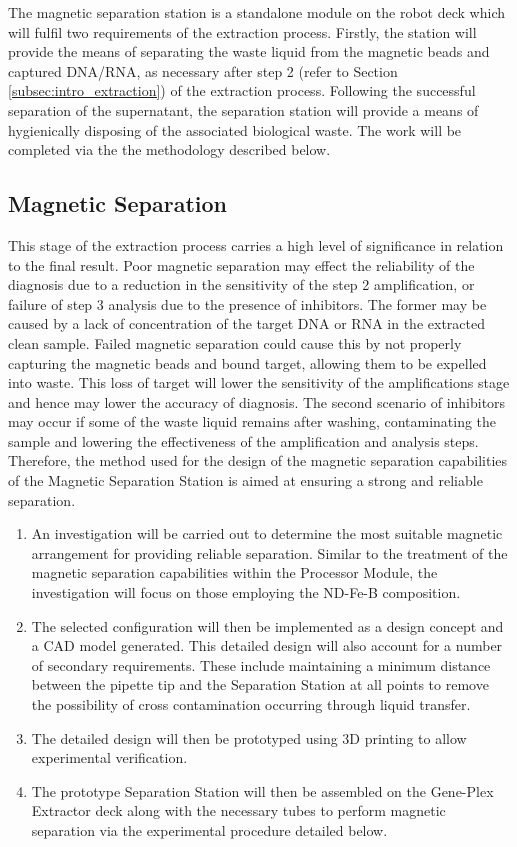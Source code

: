 The magnetic separation station is a standalone module on the robot deck which will fulfil two requirements of the extraction process. Firstly, the station will provide the means of separating the waste liquid from the magnetic beads and captured DNA/RNA, as necessary after step 2 (refer to Section \ref{subsec:intro_extraction}) of the extraction process. Following the successful separation of the supernatant, the separation station will provide a means of hygienically disposing of the associated biological waste. The work will be completed via the the methodology described below.

\subsection{Magnetic Separation}

This stage of the extraction process carries a high level of significance in relation to the final result. Poor magnetic separation may effect the reliability of the diagnosis due to a reduction in the sensitivity of the step 2 amplification, or failure of step 3 analysis due to the presence of inhibitors. The former may be caused by a lack of concentration of the target DNA or RNA in the extracted clean sample. Failed magnetic separation could cause this by not properly capturing the magnetic beads and bound target, allowing them to be expelled into waste. This loss of target will lower the sensitivity of the amplifications stage and hence may lower the accuracy of diagnosis. The second scenario of inhibitors may occur if some of the waste liquid remains after washing, contaminating the sample and lowering the effectiveness of the amplification and analysis steps. Therefore, the method used for the design of the magnetic separation capabilities of the Magnetic Separation Station is aimed at ensuring a strong and reliable separation.

\begin{enumerate}
	\item An investigation will be carried out to determine the most suitable magnetic arrangement for providing reliable separation. Similar to the treatment of the magnetic separation capabilities within the Processor Module, the investigation will focus on those employing the ND-Fe-B composition.
	\item The selected configuration will then be implemented as a design concept and a CAD model generated. This detailed design will also account for a number of secondary requirements. These include maintaining a minimum distance between the pipette tip and the Separation Station at all points to remove the possibility of cross contamination occurring through liquid transfer.
	\item The detailed design will then be prototyped using 3D printing to allow experimental verification.
	\item The prototype Separation Station will then be assembled on the Gene-Plex Extractor deck along with the necessary tubes to perform magnetic separation via the experimental procedure detailed below.
\end{enumerate}


